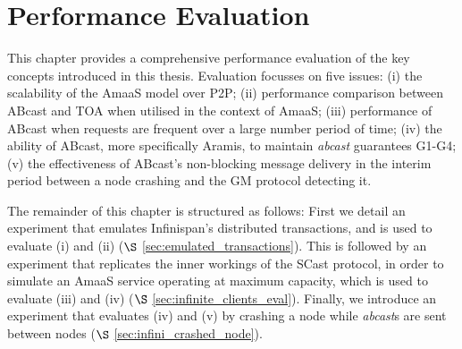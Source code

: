 \chapter{Performance Evaluation}\label{ch:perf_eval}
    \graphicspath{{Chapter6-PerformanceEvaluation/Figs/Vector/}{Chapter6-PerformanceEvaluation/Figs/}}
    
    This chapter provides a comprehensive performance evaluation of the key concepts introduced in this thesis.  Evaluation focusses on five issues: (i) the scalability of the \textsf{AmaaS} model over P2P; (ii) performance comparison between \textsf{ABcast} and TOA when utilised in the context of \textsf{AmaaS}; (iii) performance of \textsf{ABcast} when requests are frequent over a large number period of time; (iv) the ability of \textsf{ABcast}, more specifically \textsf{Aramis}, to maintain  \emph{abcast} guarantees G1-G4; (v)  the effectiveness of \textsf{ABcast}'s non-blocking message delivery in the interim period between a node crashing and the GM protocol detecting it.  
   
    The remainder of this chapter is structured as follows: First we detail an experiment that emulates Infinispan's distributed transactions, and is used to evaluate (i) and (ii) ($\S$ \ref{sec:emulated_transactions}).  This is followed by an experiment that replicates the inner workings of the \textsf{SCast} protocol, in order to simulate an \textsf{AmaaS} service operating at maximum capacity, which is used to evaluate (iii) and (iv) ($\S$ \ref{sec:infinite_clients_eval}).  Finally, we introduce an experiment that evaluates (iv) and (v) by crashing a node while \emph{abcast}s are sent between nodes ($\S$ \ref{sec:infini_crashed_node}).  


